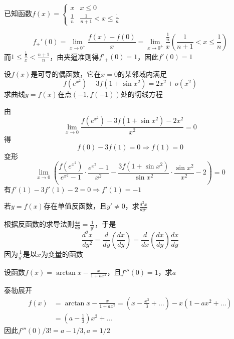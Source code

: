 \documentclass{article}
\begin{document}
\begin{examplle}[]
已知函数\(\displaystyle f(x)=\begin{cases}x&x\le0\\\frac{1}{n}&\frac{1}{n+1}
  <x\le\frac{1}{n}\end{cases}\)

\begin{equation*}
f_+'(0)=\lim_{x\to0^+}\frac{f(x)-f(0)}{x}=\lim_{x\to0^+}\frac{\frac{1}{n}}{x}
\left(\frac{1}{n+1}<x\le\frac{1}{n}
\right)
\end{equation*}
而\(1\le\frac{\frac{1}{n}}{x}<\frac{n+1}{n}\)，由夹逼准则得\(f'_+(0)=1\)，因此\(f'(0)=1\)
\end{examplle}

\begin{examplle}[]
设\(f(x)\)是可导的偶函数，它在\(x=0\)的某邻域内满足
\begin{equation*}
f(e^{x^2})-3f(1+\sin x^2)=2x^2+o(x^2)
\end{equation*}
求曲线\(y=f(x)\)在点\((-1,f(-1))\)处的切线方程

由
\begin{equation*}
\lim_{x\to0}\frac{f(e^{x^2})-3f(1+\sin x^2)-2x^2}{x^2}=0
\end{equation*}
得
\begin{equation*}
f(0)-3f(1)=0\Rightarrow f(1)=0
\end{equation*}
变形
\begin{equation*}
\lim_{x\to0}\left(
\frac{f(e^{x^2})}{e^{x^2}-1}\cdot\frac{e^{x^2}-1}{x^2}-
\frac{3f(1+\sin x^2)}{\sin x^2}\cdot\frac{\sin x^2}{x^2}-2
\right)=0
\end{equation*}
有\(f'(1)-3f'(1)-2=0\Rightarrow f'(1)=-1\)
\end{examplle}

\begin{examplle}[]
若\(y=f(x)\)存在单值反函数，且\(y'\neq0\)，求\(\frac{d^2x}{dy^2}\)

根据反函数的求导法则\(\frac{dx}{dy}=\frac{1}{y'}\)，于是
\begin{equation*}
\frac{d^2x}{dy^2}=\frac{d}{dy}\left(\frac{dx}{dy}\right)=
\frac{d}{dx}\left(\frac{dx}{dy}\right)\frac{dx}{dy}
\end{equation*}
因为\(\frac{1}{y'}\)是以\(x\)为变量的函数
\end{examplle}

\begin{examplle}[]
设函数\(f(x)=\arctan x-\frac{x}{1+ax^2}\)，且\(f'''(0)=1\)，求\(a\)

泰勒展开
\begin{align*}
f(x)&=\arctan x-\frac{x}{1+ax^2}=
\left(x-\frac{x^3}{3}+\dots
\right)-x(1-ax^2+\dots)\\
&=(a-\frac{1}{3})x^3+\dots
\end{align*}
因此\(f'''(0)/3!=a-1/3,a=1/2\)
\end{examplle}
\end{document}

